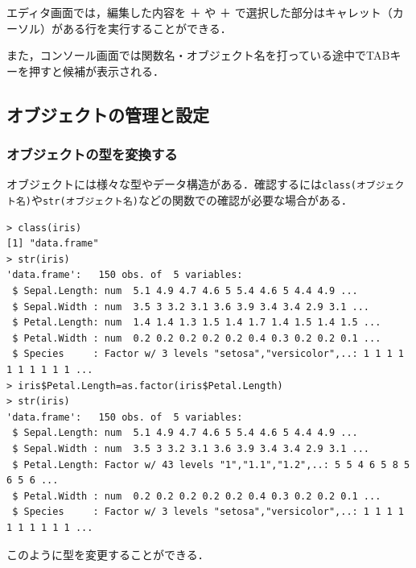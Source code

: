 エディタ画面では，編集した内容を  ＋  や  ＋  で選択した部分はキャレット（カーソル）がある行を実行することができる．

また，コンソール画面では関数名・オブジェクト名を打っている途中でTABキーを押すと候補が表示される．
\subsection{オブジェクトの管理と設定}
\subsubsection{オブジェクトの型を変換する}
オブジェクトには様々な型やデータ構造がある．確認するには\verb+class(オブジェクト名)+や\verb+str(オブジェクト名)+などの関数での確認が必要な場合がある．
\begin{breakbox}
\begin{verbatim}
> class(iris)
[1] "data.frame"
> str(iris)
'data.frame':   150 obs. of  5 variables:
 $ Sepal.Length: num  5.1 4.9 4.7 4.6 5 5.4 4.6 5 4.4 4.9 ...
 $ Sepal.Width : num  3.5 3 3.2 3.1 3.6 3.9 3.4 3.4 2.9 3.1 ...
 $ Petal.Length: num  1.4 1.4 1.3 1.5 1.4 1.7 1.4 1.5 1.4 1.5 ...
 $ Petal.Width : num  0.2 0.2 0.2 0.2 0.2 0.4 0.3 0.2 0.2 0.1 ...
 $ Species     : Factor w/ 3 levels "setosa","versicolor",..: 1 1 1 1 1 1 1 1 1 1 ...
> iris$Petal.Length=as.factor(iris$Petal.Length)
> str(iris)
'data.frame':   150 obs. of  5 variables:
 $ Sepal.Length: num  5.1 4.9 4.7 4.6 5 5.4 4.6 5 4.4 4.9 ...
 $ Sepal.Width : num  3.5 3 3.2 3.1 3.6 3.9 3.4 3.4 2.9 3.1 ...
 $ Petal.Length: Factor w/ 43 levels "1","1.1","1.2",..: 5 5 4 6 5 8 5 6 5 6 ...
 $ Petal.Width : num  0.2 0.2 0.2 0.2 0.2 0.4 0.3 0.2 0.2 0.1 ...
 $ Species     : Factor w/ 3 levels "setosa","versicolor",..: 1 1 1 1 1 1 1 1 1 1 ...
\end{verbatim}
\end{breakbox}
このように型を変更することができる．
